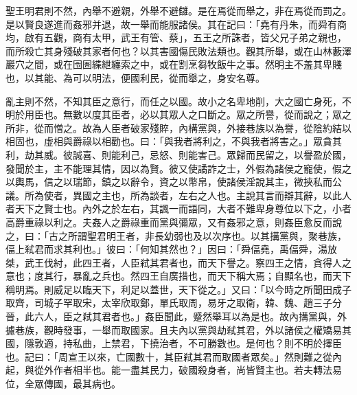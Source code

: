 \begin{pinyinscope}
聖王明君則不然，內舉不避親，外舉不避讎。是在焉從而舉之，非在焉從而罰之。是以賢良遂進而姦邪并退，故一舉而能服諸侯。其在記曰：「堯有丹朱，而舜有商均，啟有五觀，商有太甲，武王有管、蔡」，五王之所誅者，皆父兄子弟之親也，而所殺亡其身殘破其家者何也？以其害國傷民敗法類也。觀其所舉，或在山林藪澤巖穴之間，或在囹圄緤紲纏索之中，或在割烹芻牧飯牛之事。然明主不羞其卑賤也，以其能、為可以明法，便國利民，從而舉之，身安名尊。

亂主則不然，不知其臣之意行，而任之以國。故小之名卑地削，大之國亡身死，不明於用臣也。無數以度其臣者，必以其眾人之口斷之。眾之所譽，從而說之；眾之所非，從而憎之。故為人臣者破家殘賥，內構黨與，外接巷族以為譽，從陰約結以相固也，虛相與爵祿以相勸也。曰：「與我者將利之，不與我者將害之。」眾貪其利，劫其威。彼誠喜、則能利己，忌怒、則能害己。眾歸而民留之，以譽盈於國，發聞於主，主不能理其情，因以為賢。彼又使譎詐之士，外假為諸侯之寵使，假之以輿馬，信之以瑞節，鎮之以辭令，資之以幣帛，使諸侯淫說其主，微挾私而公議。所為使者，異國之主也，所為談者，左右之人也。主說其言而辯其辭，以此人者天下之賢士也。內外之於左右，其諷一而語同，大者不難卑身尊位以下之，小者高爵重祿以利之。夫姦人之爵祿重而黨與彌眾，又有姦邪之意，則姦臣愈反而說之，曰：「古之所謂聖君明王者，非長幼弱也及以次序也。以其搆黨與，聚巷族，偪上弒君而求其利也。」彼曰：「何知其然也？」因曰：「舜偪堯，禹偪舜，湯放桀，武王伐紂，此四王者，人臣弒其君者也，而天下譽之。察四王之情，貪得人之意也；度其行，暴亂之兵也。然四王自廣措也，而天下稱大焉；自顯名也，而天下稱明焉。則威足以臨天下，利足以蓋世，天下從之。」又曰：「以今時之所聞田成子取齊，司城子罕取宋，太宰欣取鄭，單氏取周，易牙之取衛，韓、魏、趙三子分晉，此六人，臣之弒其君者也。」姦臣聞此，蹙然舉耳以為是也。故內搆黨與，外攄巷族，觀時發事，一舉而取國家。且夫內以黨與劫弒其君，外以諸侯之權矯易其國，隱敦適，持私曲，上禁君，下撓治者，不可勝數也。是何也？則不明於擇臣也。記曰：「周宣王以來，亡國數十，其臣弒其君而取國者眾矣。」然則難之從內起，與從外作者相半也。能一盡其民力，破國殺身者，尚皆賢主也。若夫轉法易位，全眾傳國，最其病也。


\end{pinyinscope}
